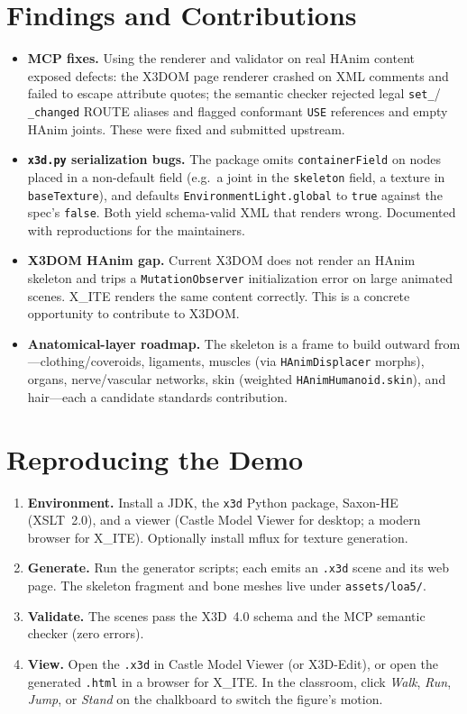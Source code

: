 \documentclass[11pt]{article}
\begin{document}
\section{Findings and Contributions}\label{sec:findings}

\begin{itemize}[leftmargin=1.4em]
\item \textbf{MCP fixes.} Using the renderer and validator on real HAnim content
  exposed defects: the X3DOM page renderer crashed on XML comments and failed to
  escape attribute quotes; the semantic checker rejected legal \texttt{set\_}/%
  \texttt{\_changed} ROUTE aliases and flagged conformant \texttt{USE} references
  and empty HAnim joints. These were fixed and submitted upstream.
\item \textbf{\texttt{x3d.py} serialization bugs.} The package omits
  \texttt{containerField} on nodes placed in a non-default field (e.g.\ a joint
  in the \texttt{skeleton} field, a texture in \texttt{baseTexture}), and defaults
  \texttt{EnvironmentLight.global} to \texttt{true} against the spec's
  \texttt{false}. Both yield schema-valid XML that renders wrong. Documented with
  reproductions for the maintainers.
\item \textbf{X3DOM HAnim gap.} Current X3DOM does not render an HAnim skeleton
  and trips a \texttt{MutationObserver} initialization error on large animated
  scenes. X\_ITE renders the same content correctly. This is a concrete
  opportunity to contribute to X3DOM.
\item \textbf{Anatomical-layer roadmap.} The skeleton is a frame to build outward
  from---clothing/coveroids, ligaments, muscles (via \texttt{HAnimDisplacer}
  morphs), organs, nerve/vascular networks, skin (weighted
  \texttt{HAnimHumanoid.skin}), and hair---each a candidate standards
  contribution.
\end{itemize}

\section{Reproducing the Demo}\label{sec:demo}

\begin{enumerate}[leftmargin=1.4em]
\item \textbf{Environment.} Install a JDK, the \texttt{x3d} Python package,
  Saxon-HE (XSLT~2.0), and a viewer (Castle Model Viewer for desktop; a modern
  browser for X\_ITE). Optionally install mflux for texture generation.
\item \textbf{Generate.} Run the generator scripts; each emits an \texttt{.x3d}
  scene and its web page. The skeleton fragment and bone meshes live under
  \texttt{assets/loa5/}.
\item \textbf{Validate.} The scenes pass the X3D~4.0 schema and the MCP semantic
  checker (zero errors).
\item \textbf{View.} Open the \texttt{.x3d} in Castle Model Viewer (or X3D-Edit),
  or open the generated \texttt{.html} in a browser for X\_ITE. In the classroom,
  click \emph{Walk}, \emph{Run}, \emph{Jump}, or \emph{Stand} on the chalkboard
  to switch the figure's motion.
\end{enumerate}
\end{document}
